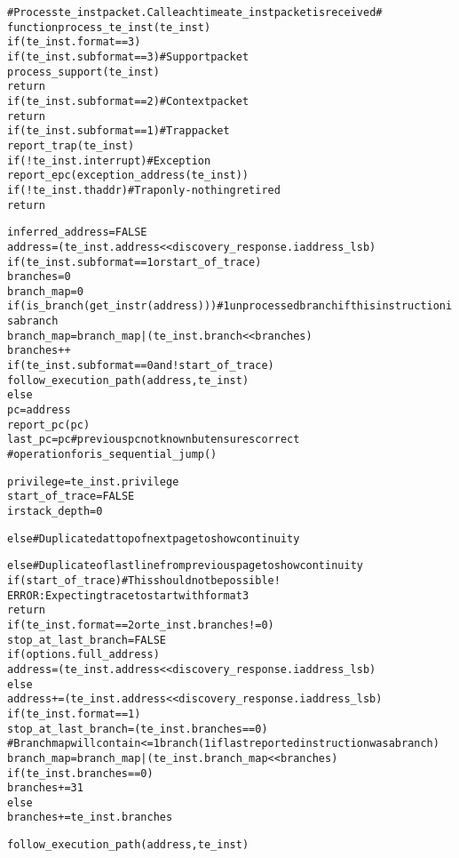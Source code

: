 \begin{alltt}
# Process te_inst packet.  Call each time a te_inst packet is received #
function process_te_inst (te_inst)
  if (te_inst.format == 3)
    if (te_inst.subformat == 3) # Support packet
      process_support(te_inst)
      return
    if (te_inst.subformat == 2) # Context packet
      return
    if (te_inst.subformat == 1) # Trap packet
      report_trap(te_inst)
      if (!te_inst.interrupt) # Exception
        report_epc(exception_address(te_inst))
      if (!te_inst.thaddr) # Trap only - nothing retired
        return

    inferred_address = FALSE
    address       = (te_inst.address << discovery_response.iaddress_lsb)
    if (te_inst.subformat == 1 or start_of_trace)
      branches    = 0
      branch_map  = 0
    if (is_branch(get_instr(address))) # 1 unprocessed branch if this instruction is a branch
      branch_map = branch_map | (te_inst.branch << branches)
      branches++
    if (te_inst.subformat == 0 and !start_of_trace)
      follow_execution_path(address, te_inst)
    else
      pc           = address
      report_pc(pc)
      last_pc      = pc # previous pc not known but ensures correct
                        #  operation for is_sequential_jump()

    privilege = te_inst.privilege
    start_of_trace = FALSE
    irstack_depth  = 0

  else # Duplicated at top of next page to show continuity
\end{alltt}
\pagebreak

\begin{alltt}
  else # Duplicate of last line from previous page to show continuity
    if (start_of_trace) # This should not be possible!
      ERROR: Expecting trace to start with format 3
      return
    if (te_inst.format == 2 or te_inst.branches != 0)
      stop_at_last_branch = FALSE
      if (options.full_address)
        address  = (te_inst.address << discovery_response.iaddress_lsb)
      else
        address += (te_inst.address << discovery_response.iaddress_lsb)
    if (te_inst.format == 1)
      stop_at_last_branch = (te_inst.branches == 0)
      # Branch map will contain <= 1 branch (1 if last reported instruction was a branch)
      branch_map = branch_map | (te_inst.branch_map << branches)
      if (te_inst.branches == 0)
        branches += 31
      else
        branches += te_inst.branches

    follow_execution_path(address, te_inst)
\end{alltt}

